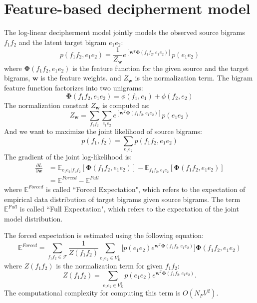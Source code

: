 \section{Feature-based decipherment model}
The log-linear decipherment model jointly models the observed source bigrams $f_1f_2$ and the latent target bigram $e_1 e_2$: 
\begin{equation}
p(f_1 f_2, e_1 e_2) = \frac{1}{Z_{\mathbf{w}}}  e^{\left[ \mathbf{w}^T\mathbf{\Phi}(f_1f_2, e_1e_2) \right]} p(e_1e_2)
\end{equation}
where $\mathbf{\Phi}(f_1f_2, e_1e_2)$ is the feature function for the given source and the target bigrams, $\mathbf{w}$ is the feature weights. and 
${Z_{\mathbf{w}}}$ is the normalization term. The bigram feature function factorizes into two unigrams:
\begin{equation}
\mathbf{\Phi}(f_1f_2, e_1e_2) = \phi(f_1, e_1) + \phi(f_2, e_2)
\end{equation}
The normalization constant ${Z_{\mathbf{w}}}$ is computed as:
\begin{equation}
{Z_{\mathbf{w}}} = \sum_{f_1f_2}\sum_{e_1e_2} e^{\left[ \mathbf{w}^T\mathbf{\Phi}(f_1f_2, e_1e_2) \right]} p(e_1e_2)
\end{equation}
And we want to maximize the joint likelihood of source bigrams:
\begin{equation}
p(f_1,f_2) = \sum_{e_1e_2}p(f_1f_2,e_1e_2)
\end{equation}
The gradient of the joint log-likelihood is:
\begin{align*}
\label{eq:grad}
\frac{\partial L} { \partial \mathbf{w}} &=    \mathbb{E}_{e_1 e_2|f_1f_2} \left[ \mathbf{\Phi}(f_1 f_2, e_1 e_2) \right  ] -
   \mathbb{E}_{f_1f_2,e_1e_2} \left[ \mathbf{\Phi}(f_1 f_2, e_1 e_2) \right  ] \\
&=  \mathbb{E}^{Forced} - \mathbb{E}^{Full}
\end{align*}
where $\mathbb{E}^{Forced}$ is called ``Forced Expectation", which refers to the expectation of empirical data distribution of target bigrams given source bigrams. 
The term $\mathbb{E}^{Full}$ is called ``Full Expectation", which refers to the expectation of the joint model distribution. 


The forced expectation is estimated using the following equation:
\begin{equation}
\mathbb{E}^{Forced} =  \sum_{f_1f_2 \in \mathcal{F}} \frac{1}{Z(f_1f_2)}  \sum_{e_1e_2 \in V_E^2}  \biggl [ p(e_1 e_2) e^{\mathbf{w}^T\mathbf{\Phi}(f_1f_2, e_1e_2)} \biggr ] \mathbf{\Phi}(f_1 f_2, e_1 e_2)
\end{equation}
where $Z(f_1f_2)$ is the normalization term for given $f_1 f_2$: 
\begin{equation}
Z(f_1f_2) = \sum_{e_1e_2 \in V_E^2} p(e_1 e_2)  e^{\mathbf{w}^T\mathbf{\Phi}(f_1f_2, e_1e_2)}.
\end{equation}
The computational complexity for computing this term is $O(N_F V^2 )$. 


